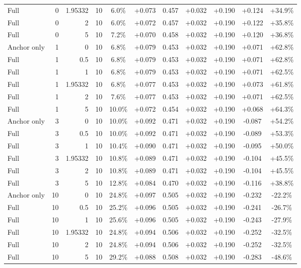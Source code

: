 \begin{table}[htbp]
\begin{tabular}{lrrrccccccc}
Full & 0 & 1.95332 & 10 & 6.0\% & +0.073 & 0.457 & +0.032 & +0.190 & +0.124 & +34.9\% \\
Full & 0 & 2 & 10 & 6.0\% & +0.072 & 0.457 & +0.032 & +0.190 & +0.122 & +35.8\% \\
Full & 0 & 5 & 10 & 7.2\% & +0.070 & 0.458 & +0.032 & +0.190 & +0.120 & +36.8\% \\
Anchor only & 1 & 0 & 10 & 6.8\% & +0.079 & 0.453 & +0.032 & +0.190 & +0.071 & +62.8\% \\
Full & 1 & 0.5 & 10 & 6.8\% & +0.079 & 0.453 & +0.032 & +0.190 & +0.071 & +62.8\% \\
Full & 1 & 1 & 10 & 6.8\% & +0.079 & 0.453 & +0.032 & +0.190 & +0.071 & +62.5\% \\
Full & 1 & 1.95332 & 10 & 6.8\% & +0.077 & 0.453 & +0.032 & +0.190 & +0.073 & +61.8\% \\
Full & 1 & 2 & 10 & 7.6\% & +0.077 & 0.453 & +0.032 & +0.190 & +0.071 & +62.5\% \\
Full & 1 & 5 & 10 & 10.0\% & +0.072 & 0.454 & +0.032 & +0.190 & +0.068 & +64.3\% \\
Anchor only & 3 & 0 & 10 & 10.0\% & +0.092 & 0.471 & +0.032 & +0.190 & -0.087 & +54.2\% \\
Full & 3 & 0.5 & 10 & 10.0\% & +0.092 & 0.471 & +0.032 & +0.190 & -0.089 & +53.3\% \\
Full & 3 & 1 & 10 & 10.4\% & +0.090 & 0.471 & +0.032 & +0.190 & -0.095 & +50.0\% \\
Full & 3 & 1.95332 & 10 & 10.8\% & +0.089 & 0.471 & +0.032 & +0.190 & -0.104 & +45.5\% \\
Full & 3 & 2 & 10 & 10.8\% & +0.089 & 0.471 & +0.032 & +0.190 & -0.104 & +45.5\% \\
Full & 3 & 5 & 10 & 12.8\% & +0.084 & 0.470 & +0.032 & +0.190 & -0.116 & +38.8\% \\
Anchor only & 10 & 0 & 10 & 24.8\% & +0.097 & 0.505 & +0.032 & +0.190 & -0.232 & -22.2\% \\
Full & 10 & 0.5 & 10 & 25.2\% & +0.096 & 0.505 & +0.032 & +0.190 & -0.241 & -26.7\% \\
Full & 10 & 1 & 10 & 25.6\% & +0.096 & 0.505 & +0.032 & +0.190 & -0.243 & -27.9\% \\
Full & 10 & 1.95332 & 10 & 24.8\% & +0.094 & 0.506 & +0.032 & +0.190 & -0.252 & -32.5\% \\
Full & 10 & 2 & 10 & 24.8\% & +0.094 & 0.506 & +0.032 & +0.190 & -0.252 & -32.5\% \\
Full & 10 & 5 & 10 & 29.2\% & +0.088 & 0.508 & +0.032 & +0.190 & -0.283 & -48.6\% \\

\end{tabular}
\end{table}
